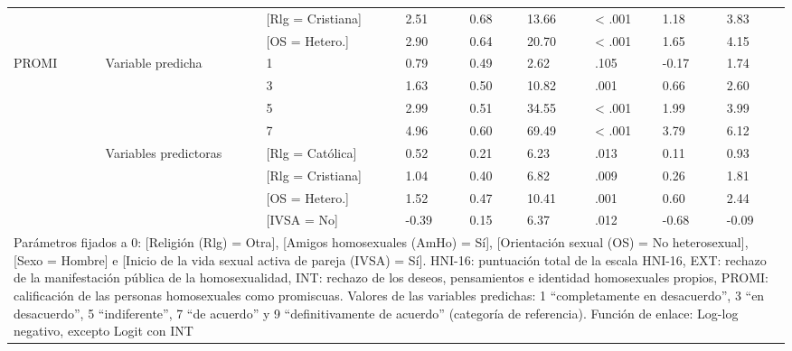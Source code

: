 \documentclass[a4paper,12pt]{article}
\begin{document}
\begin{table}
\begin{tabular}{lllllllll}
&&[Rlg = Cristiana]& 2.51& 0.68& 13.66& < .001& 1.18& 3.83\\
&&[OS = Hetero.]& 2.90& 0.64& 20.70& < .001& 1.65& 4.15\\
\multirow{8}{*}{PROMI}&\multirow{4}{*}{Variable predicha}& 1& 0.79& 0.49& 2.62& .105& -0.17& 1.74\\
&&3& 1.63& 0.50& 10.82& .001& 0.66& 2.60\\
&&5& 2.99& 0.51& 34.55& < .001& 1.99& 3.99\\
&&7& 4.96& 0.60& 69.49& < .001& 3.79& 6.12\\
& \multirow{4}{*}{Variables predictoras}& [Rlg = Católica]& 0.52& 0.21& 6.23& .013& 0.11& 0.93\\
&&[Rlg = Cristiana]& 1.04& 0.40& 6.82& .009& 0.26& 1.81\\
&&[OS = Hetero.]& 1.52& 0.47& 10.41& .001& 0.60& 2.44\\
&&[IVSA = No]& -0.39& 0.15& 6.37& .012& -0.68& -0.09\\ \hline
\multicolumn{9}{p{17.8cm}}{Parámetros fijados a 0: [Religión (Rlg) = Otra], [Amigos homosexuales (AmHo) = Sí], [Orientación
sexual (OS) = No heterosexual], [Sexo = Hombre] e [Inicio de la vida sexual activa de pareja (IVSA)
= Sí]. HNI-16: puntuación total de la escala HNI-16, EXT: rechazo de la manifestación pública de la
homosexualidad, INT: rechazo de los deseos, pensamientos e identidad homosexuales propios,
PROMI: calificación de las personas homosexuales como promiscuas. Valores de las variables
predichas: 1 “completamente en desacuerdo”, 3 “en desacuerdo”, 5 “indiferente”, 7 “de acuerdo” y
9 “definitivamente de acuerdo” (categoría de referencia). Función de enlace: Log-log negativo,
excepto Logit con INT}
\end{tabular}
\end{table}
\end{document}
